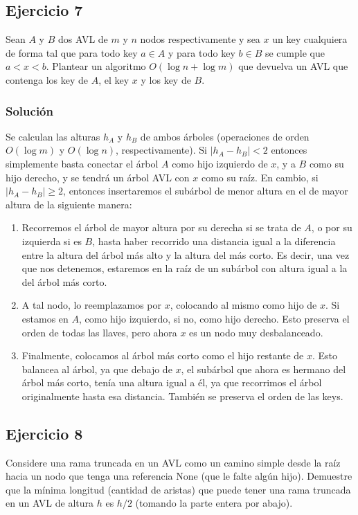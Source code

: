 \documentclass{article}
\begin{document}
\subsection*{Ejercicio 7}
Sean $A$ y $B$ dos AVL de $m$ y $n$ nodos respectivamente y sea $x$ un key cualquiera de forma tal que para todo key $a\in A$ y para todo key $b\in B$ se cumple que $a < x < b$. Plantear un algoritmo $O(\log n + \log m)$ que devuelva un AVL que contenga los key de $A$, el key $x$ y los key de $B$.
\subsubsection*{Solución}
Se calculan las alturas $h_A$ y $h_B$ de ambos árboles (operaciones de orden $O(\log m)$ y $O(\log n)$, respectivamente). Si $|h_A-h_B|<2$ entonces simplemente basta conectar el árbol $A$ como hijo izquierdo de $x$, y a $B$ como su hijo derecho, y se tendrá un árbol AVL con $x$ como su raíz. En cambio, si $|h_A-h_B|\geq 2$, entonces insertaremos el subárbol de menor altura en el de mayor altura de la siguiente manera:
\begin{enumerate}
    \item Recorremos el árbol de mayor altura por su derecha si se trata de $A$, o por su izquierda si es $B$, hasta haber recorrido una distancia igual a la diferencia entre la altura del árbol más alto y la altura del más corto. Es decir, una vez que nos detenemos, estaremos en la raíz de un subárbol con altura igual a la del árbol más corto.
    \item A tal nodo, lo reemplazamos por $x$, colocando al mismo como hijo de $x$. Si estamos en $A$, como hijo izquierdo, si no, como hijo derecho. Esto preserva el orden de todas las llaves, pero ahora $x$ es un nodo muy desbalanceado.
    \item Finalmente, colocamos al árbol más corto como el hijo restante de $x$. Esto balancea al árbol, ya que debajo de $x$, el subárbol que ahora es hermano del árbol más corto, tenía una altura igual a él, ya que recorrimos el árbol originalmente hasta esa distancia. También se preserva el orden de las keys.
\end{enumerate}


\pagebreak
\subsection*{Ejercicio 8}
Considere una rama truncada en un AVL como un camino simple desde la raíz hacia un nodo que tenga una referencia None (que le falte algún hijo). Demuestre que la mínima longitud (cantidad de aristas) que puede tener una rama truncada en un AVL de altura $h$ es $h/2$ (tomando la parte entera por abajo).
\end{document}
